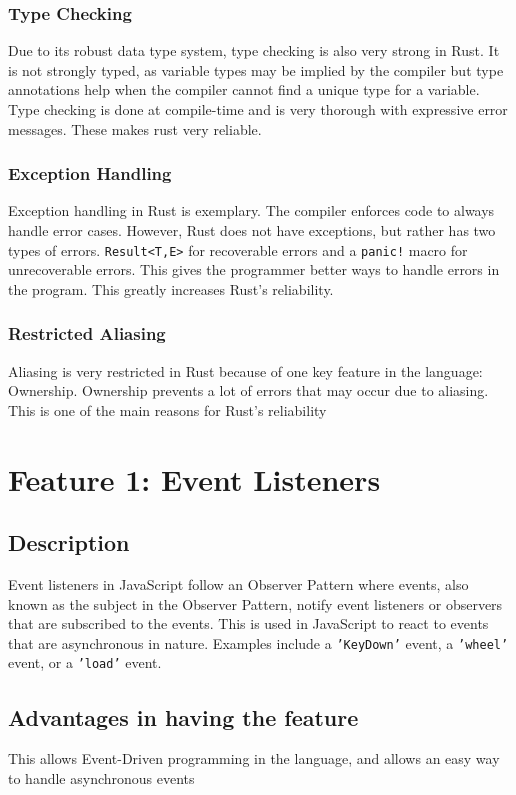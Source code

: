 \documentclass{article}
\newcommand{\jsin}[1]{\texttt{#1}}
\newcommand{\rustin}[1]{\texttt{#1}}
\begin{document}
  \subsubsection{Type Checking}
  Due to its robust data type system, type checking is also very strong in Rust.
  It is not strongly typed, as variable types may be implied by the compiler but
  type annotations help when the compiler cannot find a unique type for a
  variable. Type checking is done at compile-time and is very thorough with
  expressive error messages. These makes rust very reliable.

  \subsubsection{Exception Handling}
  Exception handling in Rust is exemplary. The compiler enforces code to always
  handle error cases. However, Rust does not have exceptions, but rather has two
  types of errors. \rustin{Result<T,E>} for recoverable errors and a
  \rustin{panic!} macro for unrecoverable errors. This gives the programmer
  better ways to handle errors in the program. This greatly increases Rust's
  reliability.

  \subsubsection{Restricted Aliasing}
  Aliasing is very restricted in Rust because of one key feature in the
  language: Ownership. Ownership prevents a lot of errors that may occur due to
  aliasing. This is one of the main reasons for Rust's reliability

  \section{Feature 1: Event Listeners}
  \subsection{Description}
  Event listeners in JavaScript follow an Observer Pattern where events, also
  known as the subject in the Observer Pattern, notify event listeners or
  observers that are subscribed to the events. This is used in JavaScript to
  react to events that are asynchronous in nature. Examples include a
  \jsin{'KeyDown'} event, a \jsin{'wheel'} event, or a \jsin{'load'} event.

  \subsection{Advantages in having the feature}
  This allows Event-Driven programming in the language, and allows an easy
  way to handle asynchronous events
\end{document}
